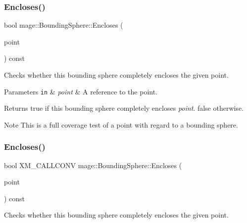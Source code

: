 \subsubsection{\texorpdfstring{Encloses()}{Encloses()}\hspace{0.1cm}{\footnotesize\ttfamily [1/4]}}
{\footnotesize\ttfamily bool mage\+::\+Bounding\+Sphere\+::\+Encloses (\begin{DoxyParamCaption}\item[{const \mbox{\hyperlink{structmage_1_1_point3}{Point3}} \&}]{point }\end{DoxyParamCaption}) const\hspace{0.3cm}{\ttfamily [noexcept]}}

Checks whether this bounding sphere completely encloses the given point.


\begin{DoxyParams}[1]{Parameters}
\mbox{\tt in}  & {\em point} & A reference to the point. \\
\hline
\end{DoxyParams}
\begin{DoxyReturn}{Returns}
{\ttfamily true} if this bounding sphere completely encloses {\itshape point}. {\ttfamily false} otherwise. 
\end{DoxyReturn}
\begin{DoxyNote}{Note}
This is a full coverage test of a point with regard to a bounding sphere. 
\end{DoxyNote}
\mbox{\label{classmage_1_1_bounding_sphere_a5174af3edc1f3a5635df5395b54ae352}} 
\subsubsection{\texorpdfstring{Encloses()}{Encloses()}\hspace{0.1cm}{\footnotesize\ttfamily [2/4]}}
{\footnotesize\ttfamily bool X\+M\+\_\+\+C\+A\+L\+L\+C\+O\+NV mage\+::\+Bounding\+Sphere\+::\+Encloses (\begin{DoxyParamCaption}\item[{F\+X\+M\+V\+E\+C\+T\+OR}]{point }\end{DoxyParamCaption}) const\hspace{0.3cm}{\ttfamily [noexcept]}}

Checks whether this bounding sphere completely encloses the given point.


